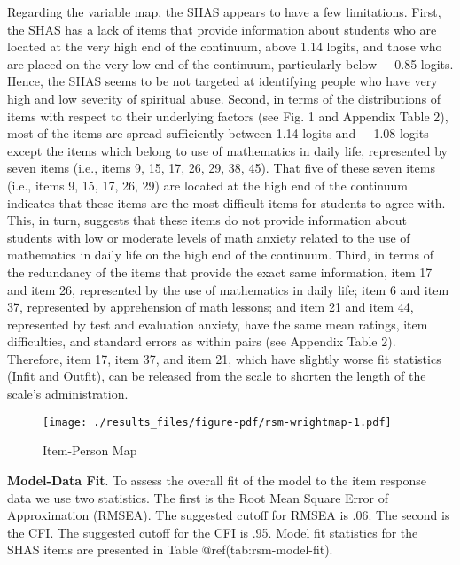 \documentclass[
  letterpaper,
  DIV=11,
  numbers=noendperiod]{scrreport}
\begin{document}
Regarding the variable map, the SHAS appears to have a few limitations.
First, the SHAS has a lack of items that provide information about
students who are located at the very high end of the continuum, above
1.14 logits, and those who are placed on the very low end of the
continuum, particularly below − 0.85 logits. Hence, the SHAS seems to be
not targeted at identifying people who have very high and low severity
of spiritual abuse. Second, in terms of the distributions of items with
respect to their underlying factors (see Fig. 1 and Appendix Table 2),
most of the items are spread sufficiently between 1.14 logits and − 1.08
logits except the items which belong to use of mathematics in daily
life, represented by seven items (i.e., items 9, 15, 17, 26, 29, 38,
45). That five of these seven items (i.e., items 9, 15, 17, 26, 29) are
located at the high end of the continuum indicates that these items are
the most difficult items for students to agree with. This, in turn,
suggests that these items do not provide information about students with
low or moderate levels of math anxiety related to the use of mathematics
in daily life on the high end of the continuum. Third, in terms of the
redundancy of the items that provide the exact same information, item 17
and item 26, represented by the use of mathematics in daily life; item 6
and item 37, represented by apprehension of math lessons; and item 21
and item 44, represented by test and evaluation anxiety, have the same
mean ratings, item difficulties, and standard errors as within pairs
(see Appendix Table 2). Therefore, item 17, item 37, and item 21, which
have slightly worse fit statistics (Infit and Outfit), can be released
from the scale to shorten the length of the scale's administration.

\begin{figure}

{\centering \texttt{[image: ./results\_files/figure-pdf/rsm-wrightmap-1.pdf]}

}

\caption{Item-Person Map}

\end{figure}

\textbf{Model-Data Fit}. To assess the overall fit of the model to the
item response data we use two statistics. The first is the Root Mean
Square Error of Approximation (RMSEA). The suggested cutoff for RMSEA is
.06. The second is the CFI. The suggested cutoff for the CFI is .95.
Model fit statistics for the SHAS items are presented in Table
@ref(tab:rsm-model-fit).
\end{document}
